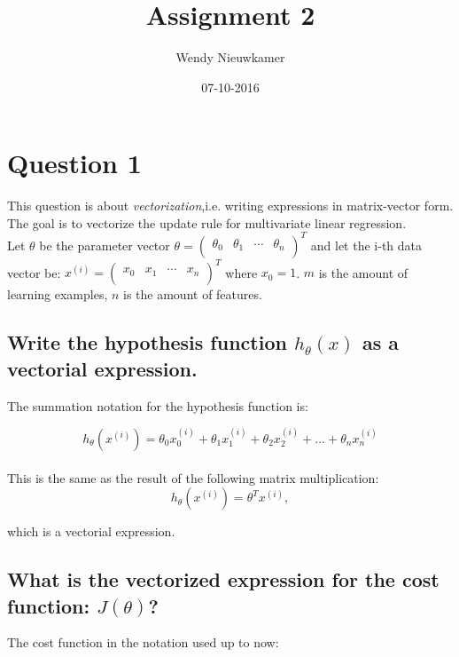 \documentclass{article}
\title {Assignment 2}
\date{07-10-2016}
\author{Wendy Nieuwkamer}
\begin{document}
\maketitle

\section{Question 1}
This question is about \textit{vectorization},i.e. writing expressions
in matrix-vector form. The goal is to vectorize the update rule
for multivariate linear regression.\\

Let $\theta$ be the parameter vector $\theta = \begin{pmatrix} \theta_0 & \theta_1 & \cdots & \theta_n \\ \end{pmatrix} ^T$ and let the i-th data vector be: $ x^{(i)} = \begin{pmatrix} x_0 & x_1 & \cdots & x_n \\\end{pmatrix}^T$ where $ x_0 = 1$. $m$ is the amount of learning examples, $n$ is the amount of features. 

\subsection{Write the hypothesis function $h_\theta(x)$ as a vectorial expression.}
	
	The summation notation for the hypothesis function is:
	
	\begin{equation*}
		h_\theta (x^{(i)}) = \theta_0 x_0^{(i)} + \theta_1 x_1^{(i)}+ \theta_2 x_2^{(i)}+ ... + \theta_n x_n^{(i)}
	\end{equation*}\\
	
	This is the same as the result of the following matrix multiplication:
	\begin{equation}
		h_\theta (x^{(i)}) = \theta^T x^{(i)},
	\end{equation}
	
	which is a vectorial expression.

\subsection{What is the vectorized expression for the cost function: $J(\theta)$?}
The cost function in the notation used up to now:
\end{document}

